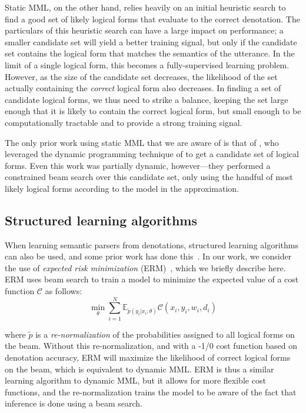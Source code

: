 Static MML, on the other hand, relies heavily on an initial heuristic search to
find a good set of likely logical forms that evaluate to the correct
denotation.  The particulars of this heuristic search can have a large impact
on performance; a smaller candidate set will yield a better training signal,
but only if the candidate set contains the logical form that matches the
semantics of the utterance.  In the limit of a single logical form, this
becomes a fully-supervised learning problem.  However, as the size of the
candidate set decreases, the likelihood of the set actually containing the
\emph{correct} logical form also decreases.  In finding a set of candidate
logical forms, we thus need to strike a balance, keeping the set large enough
that it is likely to contain the correct logical form, but small enough to be
computationally tractable and to provide a strong training signal.

The only prior work using static MML that we are aware of is that of
\citet{krishnamurthy2017neural}, who leveraged the dynamic programming
technique of \citet{pasupat2016inferring} to get a candidate set of logical
forms.  Even this work was partially dynamic, however---they performed a
constrained beam search over this candidate set, only using the handful of most
likely logical forms according to the model in the approximation.

\subsection{Structured learning algorithms} \label{sec:erm}

When learning semantic parsers from denotations, structured learning algorithms
can also be used, and some prior work has done
this~\cite{IyyerSQA2016,guu2017bridging}.  In our work, we consider the use of
\emph{expected risk minimization} (ERM)~\cite{smith2006minimum}, which we
briefly describe here.  ERM uses beam search to train a model to minimize the
expected value of a cost function $\mathcal{C}$ as follows: \begin{equation}
\min_{\theta} \sum_{i=1}^{N} \mathbb{E}_{\tilde{p}(y_i|x_i;
\theta)}\mathcal{C}(x_i, y_i, w_i, d_i) \label{eq:erm} \end{equation}

\noindent where $\tilde{p}$ is a \emph{re-normalization} of the probabilities
assigned to all logical forms on the beam.  Without this re-normalization, and
with a -1/0 cost function based on denotation accuracy, ERM will maximize the
likelihood of correct logical forms on the beam, which is equivalent to dynamic
MML\@.  ERM is thus a similar learning algorithm to dynamic MML, but it allows
for more flexible cost functions, and the re-normalization trains the model to
be aware of the fact that inference is done using a beam search.


